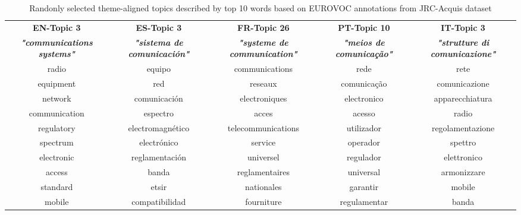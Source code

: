 \begin{table}\centering
  \small
  \noindent
  \begin{tabularx}{\linewidth}{@{} CCCCC @{}}
  \hline
 \textbf{EN-Topic 3} & \textbf{ES-Topic 3} & \textbf{FR-Topic 26} & \textbf{PT-Topic 10} & \textbf{IT-Topic 3}  \\
\textbf{\textit{{\scriptsize "communications systems"}}} & \textbf{\textit{{\scriptsize "sistema de comunicaci\'on"}}} & \textbf{\textit{{\scriptsize "systeme de communication"}}} & \textbf{\textit{{\scriptsize "meios de comunicação"}}} & \textbf{\textit{{\scriptsize "strutture di comunicazione"}}} \\ 
  \hline
     radio          & equipo                & communications		& rede         & rete        \\
     equipment      & red                   & reseaux            & comunicação   & comunicazione        \\
     network        & comunicaci\'on        & electroniques      & electronico    & apparecchiatura        \\
     communication  & espectro              & acces              & acesso    & radio        \\
     regulatory     & electromagn\'etico    & telecommunications & utilizador & regolamentazione            \\
     spectrum       & electr\'onico         & service            & operador & spettro           \\
     electronic     & reglamentaci\'on      & universel          & regulador    & elettronico                  \\
     access         & banda                 & reglamentaires     & universal        & armonizzare        \\
     standard       & etsir                 & nationales         & garantir   & mobile         \\
     mobile         & compatibilidad        & fourniture         & regulamentar  & banda          \\
    \bottomrule
  \end{tabularx}
\caption{Randonly selected theme-aligned topics described by top 10 words based on EUROVOC annotations from JRC-Acquis dataset}
\label{tb:topics}
\end{table}

